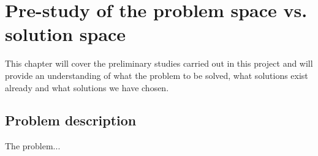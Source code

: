 \chapter{Pre-study of the problem space vs. solution space}
This chapter will cover the preliminary studies carried out in this project and will provide an understanding of what the problem to be solved, what solutions exist already and what solutions we have chosen.

\section{Problem description}

The problem...